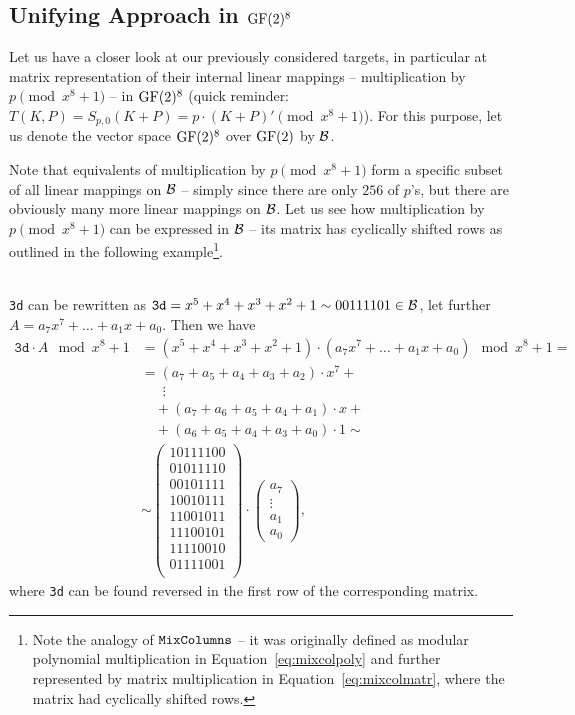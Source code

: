 \subsection{Unifying Approach in $\mathrm{GF}(2)^8$}
\label{sec:unify}

Let us have a closer look at our previously considered targets, in particular at matrix representation of their internal linear mappings -- multiplication by $p\pmod{x^8+1}$ -- in $\mathrm{GF}(2)^8$ (quick reminder: $T(K,P) = S_{p,0}(K+P) = p \cdot (K+P)' \pmod{x^8+1}$). For this purpose, let us denote the vector space $\mathrm{GF}(2)^8$ over $\mathrm{GF}(2)$ by $\cal B$.

Note that equivalents of multiplication by $p\pmod{x^8+1}$ form a specific subset of all linear mappings on $\cal B$ -- simply since there are only $256$ of $p$'s, but there are obviously many more linear mappings on $\cal B$. Let us see how multiplication by $p\pmod{x^8+1}$ can be expressed in $\cal B$ -- its matrix has cyclically shifted rows as outlined in the following example\footnote{Note the analogy of $\texttt{MixColumns}$ -- it was originally defined as modular polynomial multiplication in Equation~\ref{eq:mixcolpoly} and further represented by matrix multiplication in Equation~\ref{eq:mixcolmatr}, where the matrix had cyclically shifted rows.}.

\begin{example}
\label{ex:shiftmatrix}
	~ \\
	{\tt 3d} can be rewritten as $\texttt{3d} = x^5+x^4+x^3+x^2+1 \sim 00111101 \in\cal B$, let further $A = a_7x^7+\ldots+a_1x+a_0$. Then we have
	\begin{align*}
		\texttt{3d} \cdot A \mod{x^8+1} &= (x^5+x^4+x^3+x^2+1) \cdot (a_7x^7+\ldots+a_1x+a_0) \mod{x^8+1} = \\
		&= (a_7+a_5+a_4+a_3+a_2)\cdot x^7 + ~\\
		&\;\;\quad\vdots \\
		&\quad + (a_7+a_6+a_5+a_4+a_1)\cdot x + ~\\
		&\quad + (a_6+a_5+a_4+a_3+a_0)\cdot 1 \sim \\
		&\sim
		\begin{pmatrix}
			\boxed{10111100} \\
			01011110 \\
			00101111 \\
			10010111 \\
			11001011 \\
			11100101 \\
			11110010 \\
			01111001 \\
		\end{pmatrix}
		\cdot
		\begin{pmatrix}
			a_7 \\ \vdots \\ a_1 \\ a_0
		\end{pmatrix} ,
	\end{align*}
	where {\tt 3d} can be found reversed in the first row of the corresponding matrix.
\end{example}

